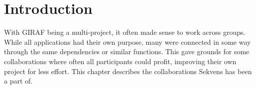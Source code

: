 \section{Introduction}\label{sec:collab:Introduction}
With GIRAF being a multi-project, it often made sense to work across groups. While all applications had their own purpose, many were connected in some way through the same dependencies or similar functions. This gave grounds for some collaborations where often all participants could profit, improving their own project for less effort. This chapter describes the collaborations Sekvens has been a part of.